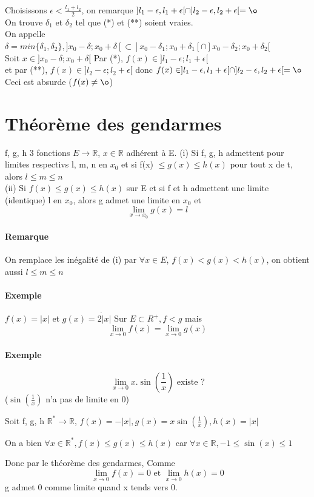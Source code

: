 Choisissons $\epsilon < \frac{l_1+l_2}{2}$, on remarque $]l_1 - \epsilon, l_1 + \epsilon[ \cap ]l_2 - \epsilon, l_2 + \epsilon[ = \o$
~\\
	On trouve $\delta_1$ et $\delta_2$ tel que (*) et (**) soient vraies.
~\\
On appelle $\delta = min\{\delta_1, \delta_2\}, ]x_0-\delta; x_0+\delta[ \subset ]x_0 - \delta_1; x_0+\delta_1[ \cap ]x_0-\delta_2;x_0+\delta_2[$
~\\

Soit $x \in ]x_0-\delta; x_0+\delta[$ Par (*), $f(x) \in ]l_1-\epsilon; l_1+\epsilon[$
~\\
et par (**), $f(x) \in ]l_2-\epsilon; l_2+\epsilon[$ donc $f(x) \in ]l_1 - \epsilon, l_1 + \epsilon[ \cap ]l_2 - \epsilon, l_2 + \epsilon[ = \o $ Ceci est absurde ($f(x) \neq \o$)
~\\

\section{Théorème des gendarmes}
f, g, h 3 fonctions $E \rightarrow \mathbb{R}$, $x\in \mathbb{R}$ adhérent à E. \newline
(i) Si f, g, h admettent pour limites respectivs l, m, n en $x_0$ et si f(x) $\leq g(x) \leq h(x)$ pour tout x de t, alors $l \leq m \leq n$
~\\
(ii) Si $f(x) \leq g(x) \leq h(x)$ sur E et si f et h admettent une limite (identique) l en $x_0$, alors g admet une limite en $x_0$ et \[\lim_{x \to x_0} g(x) = l\]

\paragraph{Remarque} On remplace les inégalité de (i) par $\forall x \in E$, $f(x) < g(x) < h(x)$, on obtient aussi $l \leq m \leq n$

\paragraph{Exemple} $f(x) = |x|$ et $g(x) = 2\dot |x|$ Sur $E \subset R^+, f<g$ mais \[\lim_{x \to 0}f(x) = \lim_{x \to 0} g(x) \]

\paragraph{Exemple} \[\lim_{x \to 0} x .\sin(\frac{1}{x}) \text{ existe ?}\]
($\sin(\frac{1}{x})$ n'a pas de limite en 0)

Soit f, g, h $\mathbb{R}^* \rightarrow \mathbb{R}$, $f(x) = -|x|, g(x) = x \sin(\frac{1}{x}), h(x) = |x|$

On a bien $\forall x \in \mathbb{R}^*, f(x) \leq g(x) \leq h(x)$ car $\forall x \in \mathbb{R}, -1 \leq \sin(x) \leq 1$

Donc par le théorème des gendarmes, Comme \[\lim_{x \to 0} f(x) = 0 \text{ et } \lim_{x \to 0} h(x) = 0\] g admet 0 comme limite quand x tends vers 0.
